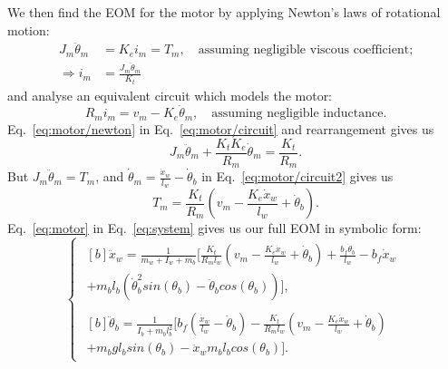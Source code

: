 \documentclass[11pt]{article} %
\begin{document}
We then find the \ac{EOM} for the motor by applying Newton's laws of rotational motion:
\begin{align}
  J_m \ddot{\theta}_m &= K_e i_m = T_m, \quad \text{assuming negligible viscous coefficient;}\nonumber \\
  \Rightarrow i_m &= \frac{J_m \ddot{\theta}_m}{K_t}\label{eq:motor/newton}
\end{align}
and analyse an equivalent circuit which models the motor:
\begin{equation}\label{eq:motor/circuit}
R_m i_m = v_m - K_e \dot{\theta}_m, \quad \text{assuming negligible inductance.}
\end{equation}
Eq.~\eqref{eq:motor/newton} in Eq.~\eqref{eq:motor/circuit} and rearrangement gives us
\begin{equation}\label{eq:motor/circuit2}
  J_m \ddot{\theta}_m
  + \frac{K_t K_e}{R_m} \dot{\theta}_m
  = \frac{K_t}{R_m}.
\end{equation}
But $J_m \ddot{\theta}_m = T_m$, and $\dot{\theta}_m = \frac{\dot{x}_w}{l_w} - \dot{\theta}_b$ in Eq.~\eqref{eq:motor/circuit2} gives us
\begin{equation}\label{eq:motor}
  T_m = \frac{K_t}{R_m}\left(
    v_m
    - \frac{K_e \dot{x}_w}{l_w}
    + \dot{\theta}_b
  \right).
\end{equation}
Eq.~\eqref{eq:motor} in Eq.~\eqref{eq:system} gives us our full \ac{EOM} in symbolic form:
\begin{equation}\label{eq:system-nonlinear}
  \begin{cases}
    \begin{aligned}[b]
      \ddot{x}_w =
      \frac{1}{m_w + I_w + m_b}\bigg[
      \frac{K_t}{R_m l_w}\left(
        v_m
        - \frac{K_e \dot{x}_w}{l_w}
        + \dot{\theta}_b
      \right)
      + \frac{b_f \dot{\theta}_b}{l_w}
      - b_f \dot{x}_w\\
      + m_b l_b \left(
        \dot{\theta}^2_b sin(\theta_b)
        - \ddot{\theta}_b cos(\theta_b)
      \right)
      \bigg],
    \end{aligned}\\[1em]
  \begin{aligned}[b]
    \ddot{\theta}_b =
    \frac{1}{I_b + m_b l_b^2}\bigg[
      b_f\left(
        \frac{\dot{x}_w}{l_w}
        - \dot{\theta}_b
      \right)
      - \frac{K_t}{R_m l_w}\left(
        v_m
        - \frac{K_e \dot{x}_w}{l_w}
        + \dot{\theta}_b
      \right)\\
      + m_b g l_b sin(\theta_b)
      - \ddot{x}_w m_b l_b cos(\theta_b)
    \bigg].
    \end{aligned}
  \end{cases}
\end{equation}
\end{document}
